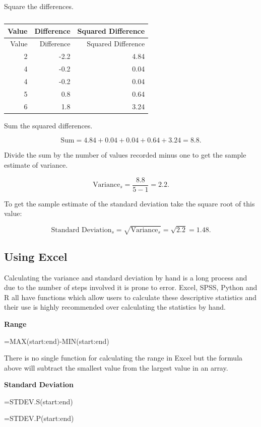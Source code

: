 \documentclass[
]{book}
\begin{document}
Square the differences.

\begin{longtable}[]{@{}rrr@{}}
\caption{\label{tab:table9}}\tabularnewline
\toprule
Value & Difference & Squared Difference \\
\midrule
\endfirsthead
\toprule
Value & Difference & Squared Difference \\
\midrule
\endhead
2 & -2.2 & 4.84 \\
4 & -0.2 & 0.04 \\
4 & -0.2 & 0.04 \\
5 & 0.8 & 0.64 \\
6 & 1.8 & 3.24 \\
\bottomrule
\end{longtable}

Sum the squared differences.

\[\textrm{Sum} = 4.84 + 0.04 + 0.04 + 0.64 + 3.24 = 8.8. \]

Divide the sum by the number of values recorded minus one to get the sample estimate of variance.

\[ \textrm{Variance}_{s} = \frac{8.8}{5-1} = 2.2.\]

To get the sample estimate of the standard deviation take the square root of this value:

\[ \textrm{Standard Deviation}_s = \sqrt{ \textrm{Variance}_{s}} = \sqrt{2.2} = 1.48.\]

\hypertarget{using-excel-1}{%
\subsection{Using Excel}\label{using-excel-1}}

Calculating the variance and standard deviation by hand is a long process and due to the number of steps involved it is prone to error. Excel, SPSS, Python and R all have functions which allow users to calculate these descriptive statistics and their use is highly recommended over calculating the statistics by hand.

\textbf{Range}

=MAX(start:end)-MIN(start:end)

There is no single function for calculating the range in Excel but the formula above will subtract the smallest value from the largest value in an array.

\textbf{Standard Deviation}

=STDEV.S(start:end)

=STDEV.P(start:end)
\end{document}
